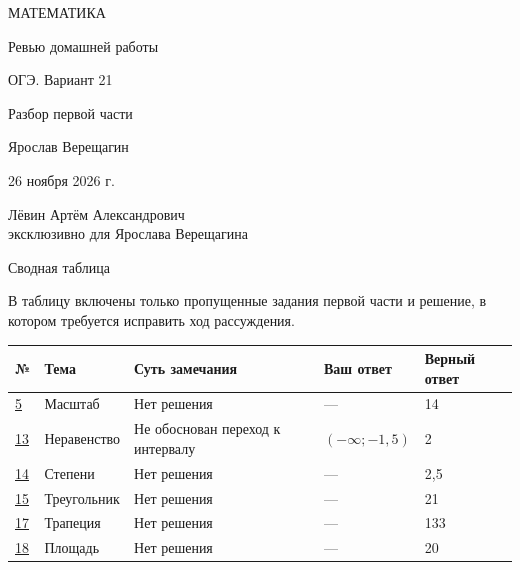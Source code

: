 \documentclass[a4paper,12pt]{article}
\newcommand{\signature}{Лёвин Артём Александрович\\эксклюзивно для Ярослава Верещагина}
\begin{document}
\begin{titlepage}
\centering
\vspace*{27mm}
{\Large\color{darkaccent} МАТЕМАТИКА\par}
\vspace{17mm}
{\Huge Ревью домашней работы\par}
\vspace{10mm}
{\LARGE\color{accent} ОГЭ. Вариант 21\par}
\vspace{17mm}
{\large Разбор первой части\par}
\vfill
{\large Ярослав Верещагин\par}
\vspace{8mm}
26 ноября 2026 г.\par
\vspace{18mm}
{\small\signature\par}
\vspace{17mm}
\end{titlepage}
\setcounter{page}{1}
{\Large\color{darkaccent} Сводная таблица}\par\medskip
В таблицу включены только пропущенные задания первой части и решение, в котором требуется исправить ход рассуждения.
\par\medskip
\renewcommand{\arraystretch}{1.45}
\begin{tabularx}{\linewidth}{@{}p{.07\linewidth}p{.20\linewidth}X p{.15\linewidth}p{.15\linewidth}@{}}
\toprule
№ & Тема & Суть замечания & Ваш ответ & Верный ответ\\
\midrule
\hyperref[task:5]{5} & Масштаб & Нет решения & --- & 14\\
\hyperref[task:13]{13} & Неравенство & Не обоснован переход к интервалу & $(-\infty;-1{,}5)$ & 2\\
\hyperref[task:14]{14} & Степени & Нет решения & --- & 2,5\\
\hyperref[task:15]{15} & Треугольник & Нет решения & --- & 21\\
\hyperref[task:17]{17} & Трапеция & Нет решения & --- & 133\\
\hyperref[task:18]{18} & Площадь & Нет решения & --- & 20\\
\bottomrule
\end{tabularx}
\clearpage
\vspace*{\fill}
\end{document}
